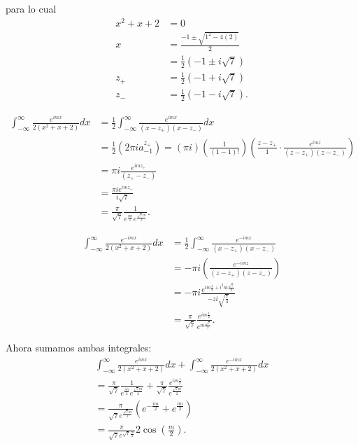 \documentclass{report}
\begin{document}
  para lo cual
  \begin{align*}
    x^2+x+2&= 0 \\
    x &= \frac{-1\pm\sqrt{1^2-4\left( 2 \right) } }{2} \\
    &= \frac{1}{2}\left( -1 \pm i\sqrt{7}  \right)  \\
    z_{+} &= \frac{1}{2}\left( -1+i\sqrt{7}  \right)  \\
    z_{-} &= \frac{1}{2}\left( -1-i\sqrt{7}  \right)
  .\end{align*}

  \begin{align*}
    \int_{-\infty}^{\infty}\frac{e^{imx}}{2\left( x^2+x+2 \right) }dx &= \frac{1}{2}\int_{-\infty}^{\infty} \frac{e^{imx}}{\left( x-z_{+} \right) \left( x-z_{-} \right) }dx \\
    &= \frac{1}{2}\left( 2\pi ia^{z_{+}}_{-1} \right) =\left( \pi i \right) \left( \frac{1}{\left( 1-1 \right)!} \right) \left( \frac{z-z_{+}}{1}\cdot \frac{e^{imz}}{\left( z-z_{+} \right) \left( z-z_{-} \right) } \right)  \\
    &= \pi i \frac{e^{imz_{+}}}{\left( z_{+}-z_{-} \right) } \\
    &= \frac{\pi i e^{imz_{+}}}{i\sqrt{7} } \\
    &= \frac{\pi}{\sqrt{7} }\frac{1}{e^{\frac{im}{2}}e^{\frac{\sqrt{7} m}{2}}}
  .\end{align*}

  \begin{align*}
    \int_{-\infty}^{\infty}\frac{e^{-imx}}{2\left( x^2+x+2 \right) }dx &= \frac{1}{2}\int_{-\infty}^{\infty}\frac{e^{-imx}}{\left( x-z_{+} \right) \left( x-z_{-} \right) } \\
    &= -\pi i\left( \frac{e^{-imz}}{\left( z-z_{+} \right) \left( z-z_{-} \right) } \right)  \\
    &= -\pi i \frac{e^{im \frac{1}{2}+i^2m \frac{\sqrt{7} }{2}}}{-zi \sqrt{\frac{7}{4}} } \\
    &= \frac{\pi}{\sqrt{7} }\frac{e^{im \frac{1}{2}}}{e^{m \frac{\sqrt{7} }{2}}}
  .\end{align*}

  Ahora sumamos ambas integrales:
  \begin{align*}
    \int_{-\infty}^{\infty}\frac{e^{imx}}{2\left( x^2+x+2 \right) }dx + \int_{-\infty}^{\infty}\frac{e^{-imx}}{2\left( x^2+x+2 \right) }dx\\
    =\frac{\pi}{\sqrt{7} }\frac{1}{e^{\frac{im}{2}}e^{\frac{\sqrt{7} m}{2}}}+ \frac{\pi}{\sqrt{7} }\frac{e^{im \frac{1}{2}}}{e^{\frac{\sqrt{7} m}{2}}}\\
    =\frac{\pi}{\sqrt{7} e^{\frac{\sqrt{7} m}{2}}}\left( e^{-\frac{im}{2}}+e^{\frac{im}{2}} \right) \\
    =\frac{\pi}{\sqrt{7} e^{\sqrt{7} \frac{m}{2}}}2\cos\left( \frac{m}{2} \right) 
  .\end{align*}
\end{document}
